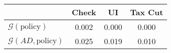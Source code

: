 \begin{tabular}{@{}lccc@{}}
\toprule
                          & Check      & UI    & Tax Cut    \\  \midrule
$\mathcal{G}(\text{policy})$ & 0.002  & 0.000  & 0.000     \\
$\mathcal{G}(AD,\text{policy})$ & 0.025  & 0.019  & 0.010     \\
\end{tabular}
